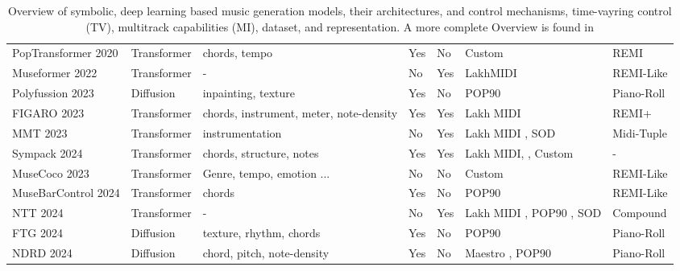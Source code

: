\begin{table}[H]
\begin{tabular}{|p{2.5cm}|p{1.8cm}|p{3cm}|p{1cm}|p{1cm}|p{3cm}|p{2.5cm}|}
        PopTransformer 2020 \cite{Huang_Yang_remi_pop_transformer_2020} & Transformer & chords, tempo & Yes & No & Custom & REMI\\
        Museformer 2022 \cite{Yu_Lu_Wang_Hu_Tan_Ye_Zhang_museformer_2022} & Transformer & - & No & Yes & LakhMIDI \cite{Raffel_2016} & REMI-Like\\
        Polyfussion 2023 \cite{Min_Jiang_Xia_Zhao_polyffusion_2023} & Diffusion & inpainting, texture & Yes & No & POP90 \cite{Wang_Chen_pop90_dataset} & Piano-Roll\\
        FIGARO 2023 \cite{Rütte_figaro_2023} & Transformer & chords, instrument, meter, note-density & Yes & Yes & Lakh MIDI \cite{Raffel_2016} & REMI+ \\
        MMT 2023 \cite{Dong_Chen_MMT_Kirkpatrick_2023} & Transformer & instrumentation & No & Yes & Lakh MIDI \cite{Raffel_2016}, SOD \cite{Crestel_OrchestralDataset} & Midi-Tuple \\
        Sympack 2024 \cite{Chen_Smith_Spijkervet_Wang_Zou_Li_Kong_Du_2024} & Transformer & chords, structure, notes & Yes & Yes & Lakh MIDI\cite{Raffel_2016}, \cite{Bertin-Mahieux_Ellis_Whitman_Lamere_2011}, Custom & -\\
        MuseCoco 2023 \cite{Lu_Xu_Kang_Yu_Xing_Tan_Bian_MuseCoco_2023} & Transformer & Genre, tempo, emotion ...  & No & No & Custom & REMI-Like\\
        MuseBarControl 2024 \cite{Shu_Xu_Musebarcontrol_2024} & Transformer & chords & Yes & No & POP90 \cite{Wang_Chen_pop90_dataset} & REMI-Like\\
        NTT 2024 \cite{Ryu_Dong_nested_2024} & Transformer & - & No  & Yes & Lakh MIDI \cite{Raffel_2016}, POP90 \cite{Wang_Chen_pop90_dataset}, SOD \cite{Crestel_OrchestralDataset} & Compound\\
        FTG 2024 \cite{Zhu_Liu_Jiang_Zheng_texture_2024} & Diffusion & texture, rhythm, chords & Yes & No & POP90 \cite{Wang_Chen_pop90_dataset} & Piano-Roll \\
        NDRD 2024 \cite{Huang_rule_diffusion_2024} & Diffusion & chord, pitch, note-density & Yes & No & Maestro \cite{hawthorne2018maestro}, POP90 \cite{Wang_Chen_pop90_dataset} & Piano-Roll \\
        \hline
    \end{tabular}
    \caption{Overview of symbolic, deep learning based music generation models, their architectures, and control mechanisms, time-vayring control (TV), multitrack capabilities (MI), dataset, and representation. A more complete Overview
    is found in \cite{Ji_Yang_Luo_survey_symbolic_2024}}
    \label{tab:music_models}
\end{table}

